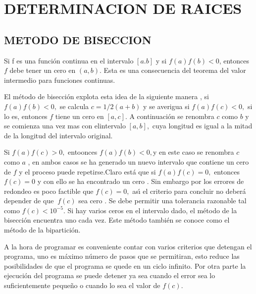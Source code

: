 \documentclass{article}%
\begin{document}
\section{DETERMINACION DE RAICES}

\subsection{METODO DE BISECCION}

\bigskip

Si f es una funci\'{o}n continua en el intervalo $\left[  a.b\right]  $ y si
$f\left(  a\right)  f\left(  b\right)  <0$, entonces $f$ debe tener un cero en
$\left(  a,b\right)  .$ Esta es una consecuencia del teorema del valor
intermedio para funciones continuas.

El m\'{e}todo de bisecci\'{o}n explota esta idea de la siguiente manera , si
$f\left(  a\right)  f\left(  b\right)  <0,$ se calcula $c=1/2(a+b)$ y se
averigua si $f\left(  a\right)  f\left(  c\right)  <0,$ si lo es, entonces $f$
tiene un cero en $\left[  a,c\right]  .$ A continuaci\'{o}n se renombra $c$
como $b$ y se comienza una vez mas con elintervalo $\left[  a,b\right]  ,$
cuya longitud es igual a la mitad de la longitud del intervalo original.

Si $f\left(  a\right)  f\left(  c\right)  >0,$ entoonces $f\left(  a\right)
f\left(  b\right)  <0,$y en este caso se renombra $c$ como $a$ , en ambos
casos se ha generado un nuevo intervalo que contiene un cero de $f$ y el
proceso puede repetirse.Claro est\'{a} que si $f\left(  a\right)  f\left(
c\right)  =0,$ entonces $f\left(  c\right)  =0$ y con ello se ha encontrado un
cero . Sin embargo por los errores de redondeo es poco factible que $f\left(
c\right)  =0,$ as\'{\i} el criterio para concluir no deber\'{a} depender de
que $\ f\left(  c\right)  $ sea cero . Se debe permitir una tolerancia
razonable tal como $f\left(  c\right)  <10^{-5}.$ Si hay varios ceros en el
intervalo dado, el m\'{e}todo de la bisecci\'{o}n encuentra uno cada vez. Este
m\'{e}todo tambi\'{e}n se conoce como el m\'{e}todo de la bipartici\'{o}n.

\bigskip

A la hora de programar es conveniente contar con varios criterios que detengan
el programa, uno es m\'{a}ximo n\'{u}mero de pasos que se permitiran, esto
reduce las posibilidades de que el programa se quede en un ciclo infinito. Por
otra parte la ejecuci\'{o}n del programa se puede detener ya sea cuando el
error sea lo suficientemente peque\~{n}o o cuando lo sea el valor de $f\left(
c\right)  .$
\end{document}
